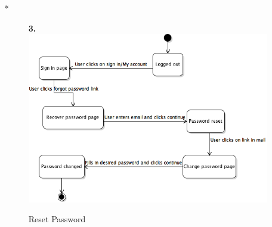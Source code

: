 \documentclass[UKenglish,12pt]{article}
\begin{document}
\begin{itemize}
\item[*]
\begin{figure}[!htbp]
\textbf{3.\newline}
\centering
\includegraphics[scale=0.7,keepaspectratio]{Images/ResetPassword.png}
\caption{Reset Password}
\end{figure}


\end{itemize}
\end{document}
